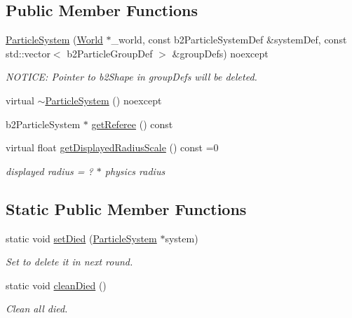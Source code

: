 \subsection*{Public Member Functions}
\begin{DoxyCompactItemize}
\item 
\hyperlink{classParticleSystem_abbb50f9bc17e323468e70a2e99fe8a10}{Particle\+System} (\hyperlink{classWorld}{World} $\ast$\+\_\+world, const b2\+Particle\+System\+Def \&system\+Def, const std\+::vector$<$ b2\+Particle\+Group\+Def $>$ \&group\+Defs) noexcept
\begin{DoxyCompactList}\small\item\em N\+O\+T\+I\+C\+E\+: Pointer to b2\+Shape in group\+Defs will be deleted. \end{DoxyCompactList}\item 
virtual \hyperlink{classParticleSystem_a257c75371728135e1209f0549d8eeb15}{$\sim$\+Particle\+System} () noexcept
\item 
b2\+Particle\+System $\ast$ \hyperlink{classParticleSystem_a7a3ebd9985d271a93fedcdb3894ebb8b}{get\+Referee} () const 
\item 
virtual float \hyperlink{classParticleSystem_a5b3bcfbc82de5d335f55173b049da517}{get\+Displayed\+Radius\+Scale} () const =0
\begin{DoxyCompactList}\small\item\em displayed radius = ? $\ast$ physics radius \end{DoxyCompactList}\end{DoxyCompactItemize}
\subsection*{Static Public Member Functions}
\begin{DoxyCompactItemize}
\item 
static void \hyperlink{classParticleSystem_a95379b5f53c63735dc9c7f76ac47ba98}{set\+Died} (\hyperlink{classParticleSystem}{Particle\+System} $\ast$system)
\begin{DoxyCompactList}\small\item\em Set to delete it in next round. \end{DoxyCompactList}\item 
static void \hyperlink{classParticleSystem_a38a1e26b5200ce585e17c71553273882}{clean\+Died} ()
\begin{DoxyCompactList}\small\item\em Clean all died. \end{DoxyCompactList}\end{DoxyCompactItemize}

